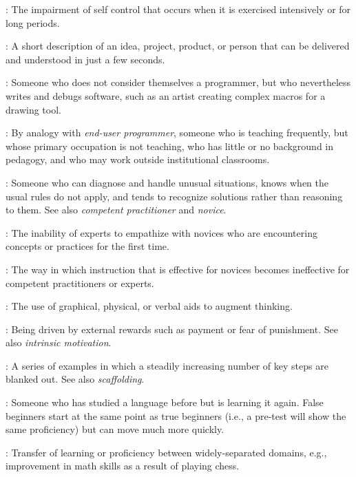 \begin{description}
: The impairment of self control that
occurs when it is exercised intensively or for long periods.

: A short description of an idea,
project, product, or person that can be delivered and understood in just a few
seconds.

: Someone who does not
consider themselves a programmer, but who nevertheless writes and debugs
software, such as an artist creating complex macros for a drawing tool.

: By analogy with \emph{end-user
  programmer}, someone who is teaching frequently, but whose primary occupation
is not teaching, who has little or no background in pedagogy, and who may work
outside institutional classrooms.

: Someone who can diagnose and handle unusual
situations, knows when the usual rules do not apply, and tends to recognize
solutions rather than reasoning to them. See also \emph{competent practitioner}
and \emph{novice}.

: The inability of experts to
empathize with novices who are encountering concepts or practices for the first
time.

: The way in which
instruction that is effective for novices becomes ineffective for competent
practitioners or experts.

: The use of graphical,
physical, or verbal aids to augment thinking.

: Being driven by external
rewards such as payment or fear of punishment. See also \emph{intrinsic
  motivation}.

: A series of examples in which a steadily
increasing number of key steps are blanked out. See also \emph{scaffolding}.

: Someone who has studied a language
before but is learning it again. False beginners start at the same point as true
beginners (i.e., a pre-test will show the same proficiency) but can move much
more quickly.

: Transfer of learning or proficiency
between widely-separated domains, e.g., improvement in math skills as a result
of playing chess.


\end{description}
